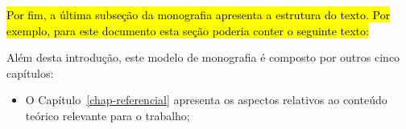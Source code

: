 \hl{Por fim, a última subseção da monografia apresenta a estrutura do texto. Por exemplo, para este documento esta seção poderia conter o seguinte texto:}

Além desta introdução, este modelo de monografia é composto por outros cinco capítulos:

\begin{itemize}
	\item O Capítulo~\ref{chap-referencial} apresenta os aspectos relativos ao conteúdo teórico relevante para o trabalho;
\end{itemize}


